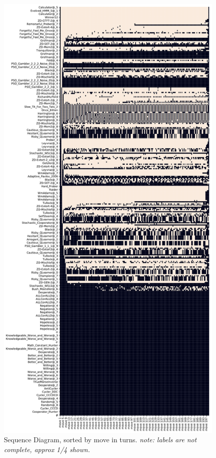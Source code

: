 \begin{appendices}
\begin{figure}[ht]
\begin{minipage}{0.48\textwidth}
    \end{minipage}\hfill
    \begin{minipage}{0.48\textwidth}
        \includegraphics[width=1.0\textwidth, center]{./img/descriptive/sequence_plot_alphabetical_pt2.pdf}
    \end{minipage}
    \caption{Sequence Diagram, sorted by move in turns. \textit{note: labels are not complete, approx 1/4 shown.}}\label{apfig:sequence_plot_alphabetical}
\end{figure}


\end{appendices}